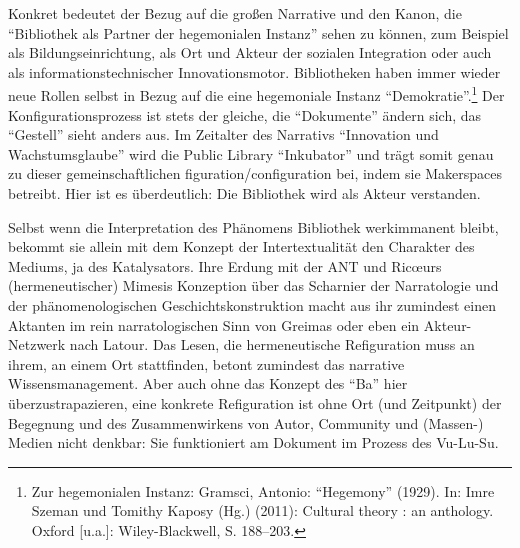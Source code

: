 Konkret bedeutet der Bezug auf die großen Narrative und den Kanon, die
\enquote{Bibliothek als Partner der hegemonialen Instanz} sehen zu
können, zum Beispiel als Bildungseinrichtung, als Ort und Akteur der
sozialen Integration oder auch als informationstechnischer
Innovationsmotor. Bibliotheken haben immer wieder neue Rollen selbst in
Bezug auf die eine hegemoniale Instanz \enquote{Demokratie}.\footnote{Zur
  hegemonialen Instanz: Gramsci, Antonio: \enquote{Hegemony} (1929). In:
  Imre Szeman und Tomithy Kaposy (Hg.) (2011): Cultural theory : an
  anthology. Oxford {[}u.a.{]}: Wiley-Blackwell, S. 188--203.} Der
Konfigurationsprozess ist stets der gleiche, die \enquote{Dokumente}
ändern sich, das \enquote{Gestell} sieht anders aus. Im Zeitalter des
Narrativs \enquote{Innovation und Wachstumsglaube} wird die Public
Library \enquote{Inkubator} und trägt somit genau zu dieser
gemeinschaftlichen figuration/configuration bei, indem sie Makerspaces
betreibt. Hier ist es überdeutlich: Die Bibliothek wird als Akteur
verstanden.

Selbst wenn die Interpretation des Phänomens Bibliothek werkimmanent
bleibt, bekommt sie allein mit dem Konzept der Intertextualität den
Charakter des Mediums, ja des Katalysators. Ihre Erdung mit der ANT und
Ricœurs (hermeneutischer) Mimesis Konzeption über das Scharnier der
Narratologie und der phänomenologischen Geschichtskonstruktion macht aus
ihr zumindest einen Aktanten im rein narratologischen Sinn von Greimas
oder eben ein Akteur-Netzwerk nach Latour. Das Lesen, die hermeneutische
Refiguration muss an ihrem, an einem Ort stattfinden, betont zumindest
das narrative Wissensmanagement. Aber auch ohne das Konzept des
\enquote{Ba} hier überzustrapazieren, eine konkrete Refiguration ist
ohne Ort (und Zeitpunkt) der Begegnung und des Zusammenwirkens von
Autor, Community und (Massen-) Medien nicht denkbar: Sie funktioniert am
Dokument im Prozess des Vu-Lu-Su.

